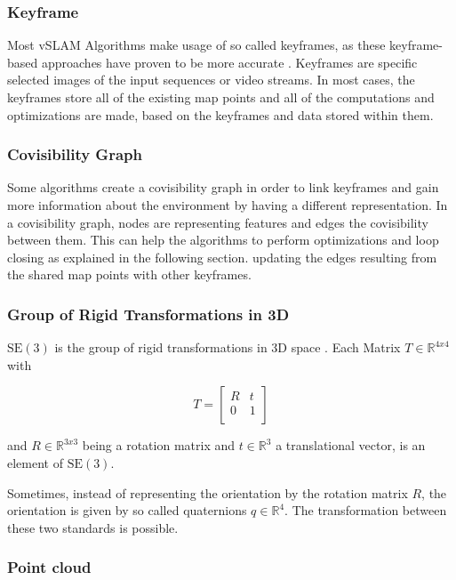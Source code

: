 		\subsubsection{Keyframe}
		
		Most vSLAM Algorithms make usage of so called keyframes, as these keyframe-based approaches have proven to be more accurate \cite{keyframe}.
		Keyframes are specific selected images of the input sequences or video streams. In most cases, the keyframes store all of the existing 
		map points and all of the computations and optimizations are made, based on the keyframes and data stored within them. 
	
		\subsubsection{Covisibility Graph}
		
		Some algorithms create a covisibility graph in order to link keyframes and gain more information about the environment by having a different representation. 
		In a covisibility graph, nodes are representing features and edges the covisibility between them. 
		This can help the algorithms to perform optimizations and loop closing as explained in the following section.
		updating the edges resulting from the shared map
		points with other keyframes.
		
		\subsubsection{Group of Rigid Transformations in 3D}\label{pose}
		
		$\text{SE}(3)$ is the group of rigid transformations in 3D space \cite{se3}. Each Matrix $ T \in \mathbb{R}^{4x4}$ with 
		
		$$ T = \left[
		\begin{array}{rrr}
		R &  t \\  
		0  & 1 \\ 
		\end{array} \right]$$
		
		and $ R \in \mathbb{R}^{3x3}$ being a rotation matrix and $ t \in \mathbb{R}^{3}$ a translational vector, is an element of $\text{SE}(3)$.
		
		Sometimes, instead of representing the orientation by the rotation matrix $R$, the orientation is given by so called quaternions $q \in \mathbb{R}^4$. 
		The transformation between these two standards is possible. 
		
		\subsubsection{Point cloud}
		
